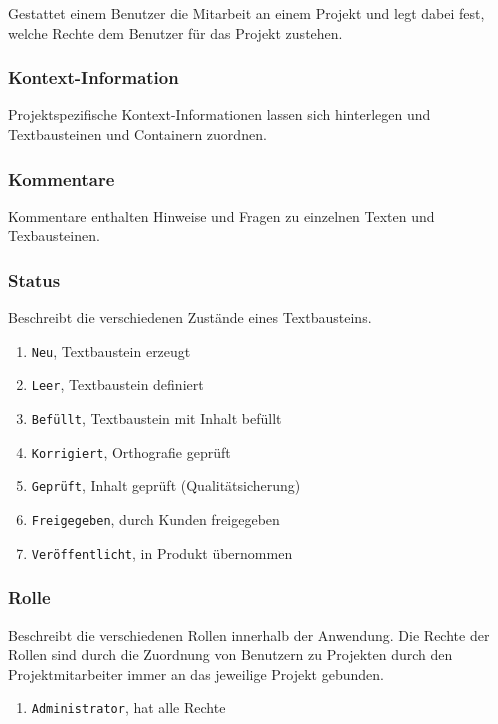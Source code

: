 Gestattet einem Benutzer die Mitarbeit an einem Projekt und legt dabei fest, welche Rechte dem Benutzer für das Projekt zustehen.

\subsubsection{Kontext-Information}\label{model:contextinfo}

Projektspezifische Kontext-Informationen lassen sich hinterlegen und Textbausteinen und Containern zuordnen.

\subsubsection{Kommentare}\label{model:notizen}

Kommentare enthalten Hinweise und Fragen zu einzelnen Texten und Texbausteinen.

\subsubsection{Status}\label{model:status}

Beschreibt die verschiedenen Zustände eines Textbausteins.

\begin{enumerate}\itemsep -5pt
\item \texttt{Neu}, Textbaustein erzeugt
\item \texttt{Leer}, Textbaustein definiert
\item \texttt{Befüllt}, Textbaustein mit Inhalt befüllt
\item \texttt{Korrigiert}, Orthografie geprüft
\item \texttt{Geprüft}, Inhalt geprüft (Qualitätsicherung)
\item \texttt{Freigegeben}, durch Kunden freigegeben
\item \texttt{Veröffentlicht}, in Produkt übernommen
\end{enumerate}

\subsubsection{Rolle}\label{model:rolle}

Beschreibt die verschiedenen Rollen innerhalb der Anwendung. Die Rechte der Rollen sind durch die Zuordnung von Benutzern zu Projekten durch den Projektmitarbeiter immer an das jeweilige Projekt gebunden.

\begin{enumerate}\itemsep -5pt
\item \texttt{Administrator}, hat alle Rechte 
\end{enumerate}

